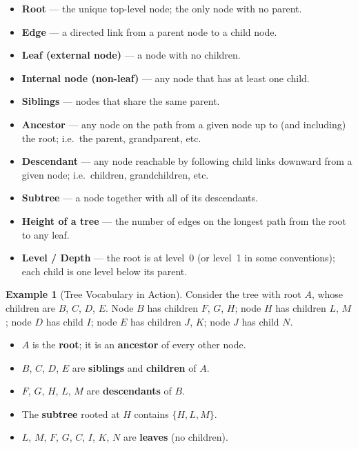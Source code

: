 \documentclass[11pt, a4paper, notitlepage]{report}
\theoremstyle{definition}
\theoremstyle{remark}
\theoremstyle{definition}
\newtheorem{example}[theorem]{Example}
\begin{document}
\begin{itemize}
  \item \textbf{Root} --- the unique top-level node; the only node with no
        parent.
  \item \textbf{Edge} --- a directed link from a parent node to a child node.
  \item \textbf{Leaf (external node)} --- a node with no children.
  \item \textbf{Internal node (non-leaf)} --- any node that has at least one
        child.
  \item \textbf{Siblings} --- nodes that share the same parent.
  \item \textbf{Ancestor} --- any node on the path from a given node up to
        (and including) the root; i.e.\ the parent, grandparent, etc.
  \item \textbf{Descendant} --- any node reachable by following child links
        downward from a given node; i.e.\ children, grandchildren, etc.
  \item \textbf{Subtree} --- a node together with all of its descendants.
  \item \textbf{Height of a tree} --- the number of edges on the longest path
        from the root to any leaf.
  \item \textbf{Level / Depth} --- the root is at level~0 (or level~1 in some
        conventions); each child is one level below its parent.
\end{itemize}

\begin{example}[Tree Vocabulary in Action]
\label{ex:tree-vocab}
Consider the tree with root $A$, whose children are $B$, $C$, $D$, $E$.  Node
$B$ has children $F$, $G$, $H$; node $H$ has children $L$, $M$; node $D$ has
child $I$; node $E$ has children $J$, $K$; node $J$ has child $N$.

\begin{itemize}
  \item $A$ is the \textbf{root}; it is an \textbf{ancestor} of every other node.
  \item $B$, $C$, $D$, $E$ are \textbf{siblings} and \textbf{children} of $A$.
  \item $F$, $G$, $H$, $L$, $M$ are \textbf{descendants} of $B$.
  \item The \textbf{subtree} rooted at $H$ contains $\{H, L, M\}$.
  \item $L$, $M$, $F$, $G$, $C$, $I$, $K$, $N$ are \textbf{leaves} (no children).
\end{itemize}
\end{example}
\end{document}
